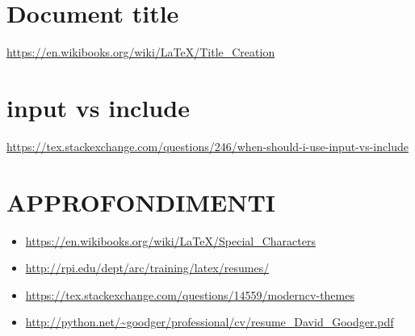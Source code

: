 \documentclass[a4paper,10pt]{article}
\begin{document}
\section{Document title}
\url{https://en.wikibooks.org/wiki/LaTeX/Title_Creation}

\section{input vs include}
\url{https://tex.stackexchange.com/questions/246/when-should-i-use-input-vs-include}

\section{APPROFONDIMENTI}
\begin{itemize}
 \item \url{https://en.wikibooks.org/wiki/LaTeX/Special_Characters}
 \item \url{http://rpi.edu/dept/arc/training/latex/resumes/}
 \item \url{https://tex.stackexchange.com/questions/14559/moderncv-themes}
 \item \url{http://python.net/~goodger/professional/cv/resume_David_Goodger.pdf}
\end{itemize}
\end{document}
